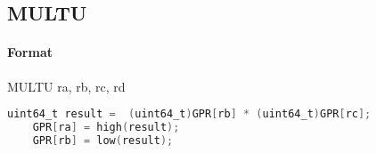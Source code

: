 \subsection{MULTU}


\paragraph{Format} MULTU ra, rb, rc, rd

\begin{lstlisting}[language=C]
    uint64_t result =  (uint64_t)GPR[rb] * (uint64_t)GPR[rc];
    GPR[ra] = high(result);
    GPR[rb] = low(result);
\end{lstlisting}